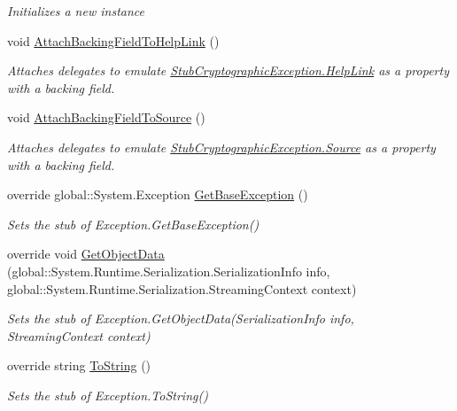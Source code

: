 \begin{DoxyCompactItemize}
\begin{DoxyCompactList}\small\item\em Initializes a new instance\end{DoxyCompactList}\item 
void \hyperlink{class_system_1_1_security_1_1_cryptography_1_1_fakes_1_1_stub_cryptographic_exception_a53f551c6537f80ec0edd1c117b16f830}{Attach\-Backing\-Field\-To\-Help\-Link} ()
\begin{DoxyCompactList}\small\item\em Attaches delegates to emulate \hyperlink{class_system_1_1_security_1_1_cryptography_1_1_fakes_1_1_stub_cryptographic_exception_aa941e97d3c3b9298c53effb2800e33dc}{Stub\-Cryptographic\-Exception.\-Help\-Link} as a property with a backing field.\end{DoxyCompactList}\item 
void \hyperlink{class_system_1_1_security_1_1_cryptography_1_1_fakes_1_1_stub_cryptographic_exception_ab7a2e7ab560ca6e32d7911daf0a0212c}{Attach\-Backing\-Field\-To\-Source} ()
\begin{DoxyCompactList}\small\item\em Attaches delegates to emulate \hyperlink{class_system_1_1_security_1_1_cryptography_1_1_fakes_1_1_stub_cryptographic_exception_a31224a0aa8cdf9fb8fe5beebc94e13e8}{Stub\-Cryptographic\-Exception.\-Source} as a property with a backing field.\end{DoxyCompactList}\item 
override global\-::\-System.\-Exception \hyperlink{class_system_1_1_security_1_1_cryptography_1_1_fakes_1_1_stub_cryptographic_exception_a5948471c69fe927a4ba67e686fb7a145}{Get\-Base\-Exception} ()
\begin{DoxyCompactList}\small\item\em Sets the stub of Exception.\-Get\-Base\-Exception()\end{DoxyCompactList}\item 
override void \hyperlink{class_system_1_1_security_1_1_cryptography_1_1_fakes_1_1_stub_cryptographic_exception_a93afda8d077ce3e8619ae10c0efcc4b5}{Get\-Object\-Data} (global\-::\-System.\-Runtime.\-Serialization.\-Serialization\-Info info, global\-::\-System.\-Runtime.\-Serialization.\-Streaming\-Context context)
\begin{DoxyCompactList}\small\item\em Sets the stub of Exception.\-Get\-Object\-Data(\-Serialization\-Info info, Streaming\-Context context)\end{DoxyCompactList}\item 
override string \hyperlink{class_system_1_1_security_1_1_cryptography_1_1_fakes_1_1_stub_cryptographic_exception_a1af13f3d9c2135f9eba59adda9dbc4f9}{To\-String} ()
\begin{DoxyCompactList}\small\item\em Sets the stub of Exception.\-To\-String()\end{DoxyCompactList}\end{DoxyCompactItemize}
